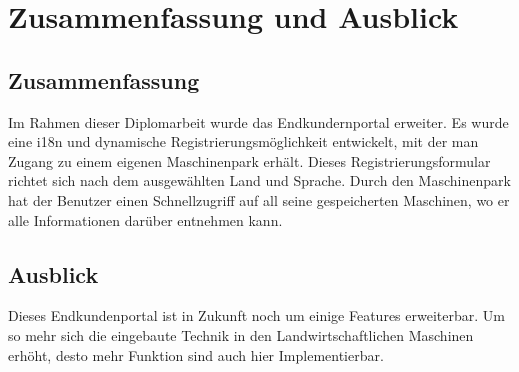 \chapter{Zusammenfassung und Ausblick}
\section{Zusammenfassung}
Im Rahmen dieser Diplomarbeit wurde das Endkundernportal erweiter. Es wurde eine i18n und dynamische Registrierungsmöglichkeit entwickelt, mit der man Zugang zu einem eigenen Maschinenpark erhält. Dieses Registrierungsformular richtet sich nach dem ausgewählten Land und Sprache. Durch den Maschinenpark hat der Benutzer einen Schnellzugriff auf all seine gespeicherten Maschinen, wo er alle Informationen darüber entnehmen kann.
\section{Ausblick}
Dieses Endkundenportal ist in Zukunft noch um einige Features erweiterbar. Um so mehr sich die eingebaute Technik in den Landwirtschaftlichen Maschinen erhöht, desto mehr Funktion sind auch hier Implementierbar.